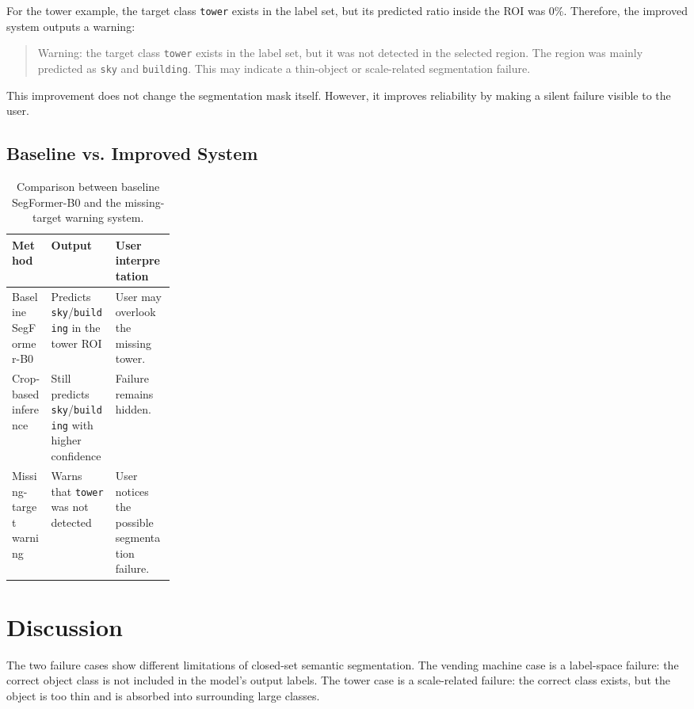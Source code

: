 \documentclass[10pt,a4paper]{article}
\begin{document}
For the tower example, the target class \texttt{tower} exists in the label set, but its predicted ratio inside the ROI was 0\%.
Therefore, the improved system outputs a warning:

\begin{quote}
Warning: the target class \texttt{tower} exists in the label set, but it was not detected in the selected region.
The region was mainly predicted as \texttt{sky} and \texttt{building}.
This may indicate a thin-object or scale-related segmentation failure.
\end{quote}

This improvement does not change the segmentation mask itself.
However, it improves reliability by making a silent failure visible to the user.

\subsection{Baseline vs. Improved System}

\begin{table}[H]
\centering
\caption{Comparison between baseline SegFormer-B0 and the missing-target warning system.}
\label{tab:missing_target_comparison}
\small
\begin{tabularx}{\linewidth}{
    >{\raggedright\arraybackslash}p{0.24\linewidth}
    >{\raggedright\arraybackslash}X
    >{\raggedright\arraybackslash}X
}
\toprule
Method & Output & User interpretation \\
\midrule
Baseline SegFormer-B0
& Predicts \texttt{sky}/\texttt{building} in the tower ROI
& User may overlook the missing tower. \\

Crop-based inference
& Still predicts \texttt{sky}/\texttt{building} with higher confidence
& Failure remains hidden. \\

Missing-target warning
& Warns that \texttt{tower} was not detected
& User notices the possible segmentation failure. \\
\bottomrule
\end{tabularx}
\end{table}

\FloatBarrier

\section{Discussion}

The two failure cases show different limitations of closed-set semantic segmentation.
The vending machine case is a label-space failure: the correct object class is not included in the model's output labels.
The tower case is a scale-related failure: the correct class exists, but the object is too thin and is absorbed into surrounding large classes.
\end{document}
